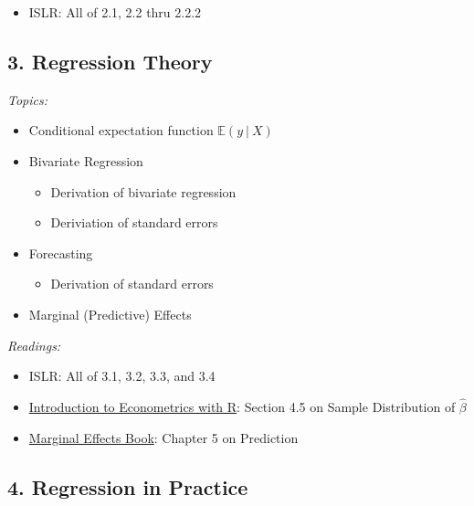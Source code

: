 \documentclass[12pt]{article}
\begin{document}
\begin{itemize}
  \item ISLR: All of 2.1, 2.2 thru 2.2.2
\end{itemize}

\subsection*{3. Regression Theory}

\noindent\emph{Topics:}

\begin{itemize}
  \item Conditional expectation function $\mathbb{E}(y \ \vert \ X)$
  
  \item Bivariate Regression 
  \begin{itemize}
    \item Derivation of bivariate regression
    \item Deriviation of standard errors 
  \end{itemize}
  
  \item Forecasting
  \begin{itemize}
    \item Derivation of standard errors
  \end{itemize}

  \item Marginal (Predictive) Effects
\end{itemize}

\bigskip
\noindent\emph{Readings:}

\begin{itemize}
  \item ISLR: All of 3.1, 3.2, 3.3, and 3.4
  \item \href{https://www.econometrics-with-r.org/4.5-tsdotoe.html}{Introduction to Econometrics with R}: Section 4.5 on Sample Distribution of $\hat{\beta}$ 
  \item \href{https://marginaleffects.com/chapters/predictions.html}{Marginal Effects Book}: Chapter 5 on Prediction
\end{itemize}
  

\subsection*{4. Regression in Practice}
\end{document}
